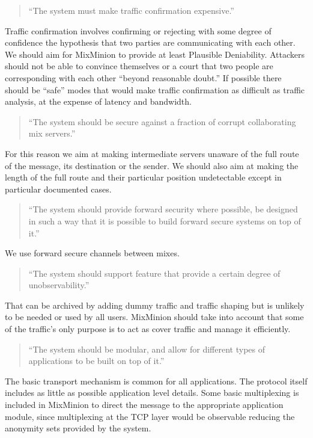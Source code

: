 \documentclass{article}
\begin{document}
\begin{quote}
     ``The system must make traffic confirmation expensive.''
\end{quote}

Traffic confirmation involves confirming or rejecting with some degree
of confidence the hypothesis that two parties are communicating with
each other. We should aim for MixMinion to provide at least Plausible 
Deniability. Attackers should not be able to convince themselves or a
court that two people are corresponding with each other ``beyond
reasonable doubt.'' If possible there should be ``safe'' modes that would 
make traffic confirmation as difficult as traffic analysis, at the
expense of latency and bandwidth.

\begin{quote}
     ``The system should be secure against a fraction of corrupt 
     collaborating mix servers.''
\end{quote}

For this reason we aim at making intermediate servers unaware of 
the full route of the message, its destination or the sender. We
should also aim at making the length of the full route and their
particular position undetectable except in particular documented
cases. 

\begin{quote}
     ``The system should provide forward security where possible, be
     designed in such a way that it is possible to build forward
     secure systems on top of it.''
\end{quote}

We use forward secure channels between mixes. 

\begin{quote}
     ``The system should support feature that provide a certain degree
      of unobservability.''
\end{quote}

That can be archived by adding dummy traffic and traffic shaping but
is unlikely to be needed or used by all users. MixMinion should take
into account that some of the traffic's only purpose is to act as
cover traffic and manage it efficiently.

\begin{quote}
     ``The system should be modular, and allow for different types of
     applications to be built on top of it.''
\end{quote}

The basic transport mechanism is common for all applications. The
protocol itself includes as little as possible application level
details. Some basic multiplexing is included in MixMinion to direct
the message to the appropriate application module, since multiplexing
at the TCP layer would be observable reducing the anonymity sets
provided by the system.
\end{document}
